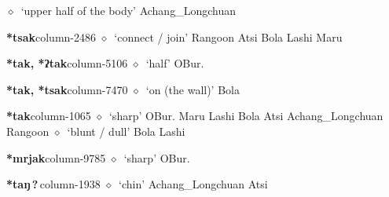          $\diamond$~`upper half of the body'
         Achang\_Longchuan 
  \item {\footnotesize \textbf{*tsak}}{\tiny column-2486}
         $\diamond$~`connect / join'
         Rangoon 
\hspace{1ex}
         Atsi 
\hspace{1ex}
         Bola 
\hspace{1ex}
         Lashi 
\hspace{1ex}
         Maru 
  \item {\footnotesize \textbf{*tak, *ʔtak}}{\tiny column-5106}
         $\diamond$~`half'
         OBur. 
  \item {\footnotesize \textbf{*tak, *tsak}}{\tiny column-7470}
         $\diamond$~`on (the wall)'
         Bola 
  \item {\footnotesize \textbf{*tak}}{\tiny column-1065}
         $\diamond$~`sharp'
         OBur. 
\hspace{1ex}
         Maru 
\hspace{1ex}
         Lashi 
\hspace{1ex}
         Bola 
\hspace{1ex}
         Atsi 
\hspace{1ex}
         Achang\_Longchuan 
\hspace{1ex}
         Rangoon 
\hspace{1ex}
         $\diamond$~`blunt / dull'
         Bola 
\hspace{1ex}
         Lashi 
  \item {\footnotesize \textbf{*mrjak}}{\tiny column-9785}
         $\diamond$~`sharp'
         OBur. 
  \item {\footnotesize \textbf{*taŋ\,?\,}}{\tiny column-1938}
         $\diamond$~`chin'
         Achang\_Longchuan 
\hspace{1ex}
         Atsi 
